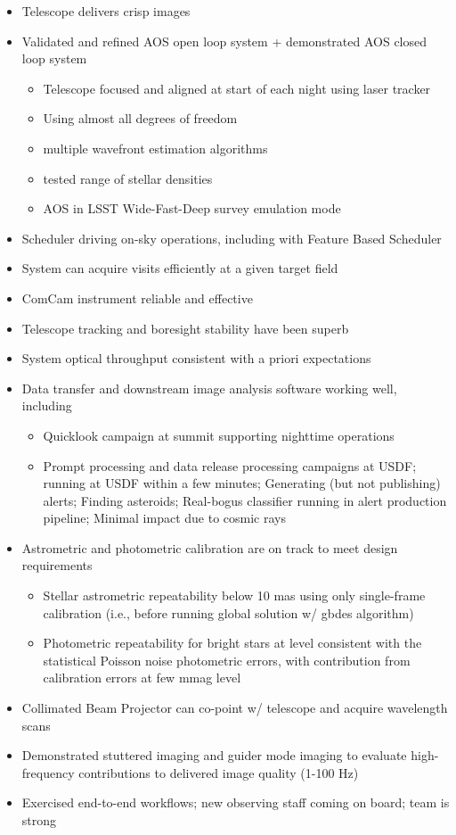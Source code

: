 \begin{itemize}
    \item Telescope delivers crisp images
    \item Validated and refined AOS open loop system + demonstrated AOS closed loop system
    \begin{itemize}
        \item Telescope focused and aligned at start of each night using laser tracker
        \item Using almost all degrees of freedom
        \item multiple wavefront estimation algorithms
        \item tested range of stellar densities
        \item AOS in LSST Wide-Fast-Deep survey emulation mode
    \end{itemize}
    \item Scheduler driving on-sky operations, including with Feature Based Scheduler
    \item System can acquire visits efficiently at a given target field
    \item ComCam instrument reliable and effective
    \item Telescope tracking and boresight stability have been superb
    \item System optical throughput consistent with a priori expectations
    \item Data transfer and downstream image analysis software working well, including
    \begin{itemize}
        \item Quicklook campaign at summit supporting nighttime operations
        \item Prompt processing and data release processing campaigns at USDF; running at USDF within a few minutes; Generating (but not publishing) alerts; Finding asteroids; Real-bogus classifier running in alert production pipeline; Minimal impact due to cosmic rays
    \end{itemize}
    \item Astrometric and photometric calibration are on track to meet design requirements
    \begin{itemize}
        \item Stellar astrometric repeatability below 10 mas using only single-frame calibration (i.e., before running global solution w/ gbdes algorithm)
        \item Photometric repeatability for bright stars at level consistent with the statistical Poisson noise photometric errors, with contribution from calibration errors at few mmag level
    \end{itemize}
    \item Collimated Beam Projector can co-point w/ telescope and acquire wavelength scans
    \item Demonstrated stuttered imaging and guider mode imaging to evaluate high-frequency contributions to delivered image quality (1-100 Hz)
    \item Exercised end-to-end workflows; new observing staff coming on board; team is strong
\end{itemize}

